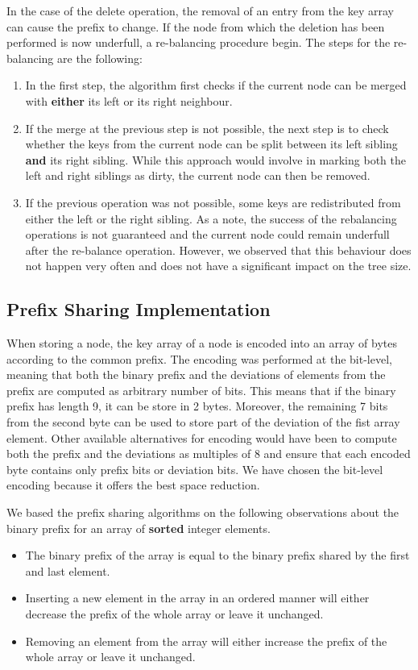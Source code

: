 \documentclass[11pt,a4paper,oneside]{article}
\begin{document}
In the case of the delete operation, the removal of an entry from the key array can cause the prefix to change. If the node from which the deletion has been performed is now underfull, a re-balancing procedure begin. The steps for the re-balancing are the following:
\begin{enumerate}
	\item In the first step, the algorithm first checks if the current node can be merged with \textbf{either} its left or its right neighbour. 
	\item If the merge at the previous step is not possible, the next step is to check whether the keys from the current node can be split between its left sibling \textbf{and} its right sibling. While this approach would involve in marking both the left and right siblings as dirty, the current node can then be removed.
	\item If the previous operation was not possible, some keys are redistributed from either the left or the right sibling. As a note, the success of the rebalancing operations is not guaranteed and the current node could remain underfull after the re-balance operation. However, we observed that this behaviour does not happen very often and does not have a significant impact on the tree size.
\end{enumerate}


\subsection{Prefix Sharing Implementation} %
\label{sub:prefix_sharing_rebalancing}
When storing a node, the key array of a node is encoded into an array of bytes according to the common prefix. The encoding was performed at the bit-level, meaning that both the binary prefix and the deviations of elements from the prefix are computed as arbitrary number of bits. This means that if the binary prefix has length 9, it can be store in 2 bytes. Moreover, the remaining 7 bits from the second byte can be used to store part of the deviation of the fist array element. Other available alternatives for encoding would have been to compute both the prefix and the deviations as multiples of 8 and ensure that each encoded byte contains only prefix bits or deviation bits. We have chosen the bit-level encoding because it offers the best space reduction.

We based the prefix sharing algorithms on the following observations about the binary prefix for an array of \textbf{sorted} integer elements.
\begin{itemize}
	\item The binary prefix of the array is equal to the binary prefix shared by the first and last element.
	\item Inserting a new element in the array in an ordered manner will either decrease the prefix of the whole array or leave it unchanged.
	\item Removing an element from the array will either increase the prefix of the whole array or leave it unchanged.
\end{itemize}
\end{document}
